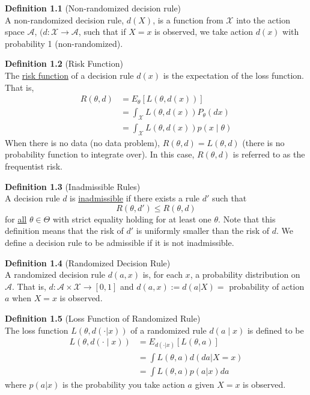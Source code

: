 \documentclass[12pt]{article}
\numberwithin{equation}{section}
\begin{document}
\textbf{Definition 1.1} (Non-randomized decision rule) \\
A non-randomized decision rule, $d(X)$, is a function from $\mathcal{X}$ into the action space $\mathcal{A}$, $(d : \mathcal{X} \to \mathcal{A}$, such that if $X = x$ is observed, we take action $d(x)$ with probability 1 (non-randomized). 

\textbf{Definition 1.2} (Risk Function) \\
The \underline{risk function} of a decision rule $d(x)$ is the expectation of the loss function. That is,
\begin{align*}
  R(\theta, d) &= E_{\theta} [L(\theta, d(x))] \\
    &= \int_{\mathcal{X}} L(\theta, d(x)) P_{\theta}(dx) \\
    &= \int_{\mathcal{X}} L(\theta, d(x)) p(x \mid \theta)
\end{align*}
%
When there is no data (no data problem), $R(\theta, d) = L(\theta, d)$ (there is no probability function to integrate over). In this case, $R(\theta, d)$ is referred to as the frequentist risk. 

\textbf{Definition 1.3} (Inadmissible Rules) \\
A decision rule $d$ is \underline{inadmissible} if there exists a rule $d'$ such that
\begin{equation*}
  R(\theta, d') \le R(\theta, d)
\end{equation*}
for \underline{all} $\theta \in \Theta$ with strict equality holding for at least one $\theta$. Note that this definition means that the risk of $d'$ is uniformly smaller than the risk of $d$. We define a decision rule to be admissible if it is not inadmissible.

\textbf{Definition 1.4} (Randomized Decision Rule) \\
A randomized decision rule $d(a, x)$ is, for each $x$, a probability distribution on $\mathcal{A}$. That is, $d : \mathcal{A} \times \mathcal{X} \to [0, 1]$ and $d(a, x) := d(a | X) = $ probability of action $a$ when $X = x$ is observed.

\textbf{Definition 1.5} (Loss Function of Randomized Rule) \\
The loss function $L(\theta, d(\cdot | x))$ of a randomized rule
$d(a \mid x)$ is defined to be
%
\begin{align*}
  L(\theta, d(\cdot \mid x)) &= 
    E_{d(\cdot | x)} [L(\theta, a)] \\
    &= \int L(\theta, a) d(da|X = x) \\
    &= \int L(\theta, a) p(a | x) da
\end{align*}
where $p(a | x)$ is the probability you take action $a$ given $X = x$ is observed.
\end{document}
